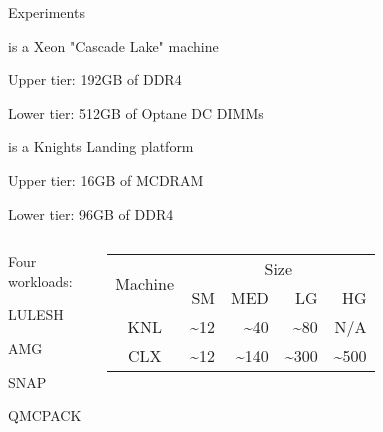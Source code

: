 \documentclass[final,hyperref={pdfpagelabels=false}]{beamer}
\begin{document}
\begin{frame}{Experiments}
  \begin{customlist}{0em}{0em}
    \item {} is a Xeon "Cascade Lake" machine
    \begin{customlist}{1em}{0em}
      \item Upper tier: 192GB of DDR4
      \item Lower tier: 512GB of Optane DC DIMMs
    \end{customlist}
    \item {} is a Knights Landing platform
    \begin{customlist}{1em}{0em}
      \item Upper tier: 16GB of MCDRAM
      \item Lower tier: 96GB of DDR4
    \end{customlist}
  \end{customlist}

  \vspace{1em}

  \begin{minipage}{\paperwidth}
  \begin{columns}[T,onlytextwidth]%
    \begin{customlist}{0em}{0em}
      \item Four workloads:
      \begin{customlist}{1em}{0em}
        \item LULESH
        \item AMG
        \item SNAP
        \item QMCPACK
      \end{customlist}
    \end{customlist}
    \centering
    \begin{table}[t]
      \centering
      \footnotesize
      \begin{tabular}{|c|r|r|r|r|}
        \hline
        \multirow{2}{*}{Machine} &
        \multicolumn{4}{c|}{Size} \\
        \cline{2-5}
        & SM & MED & LG & HG \\
        \hline

        KNL & \textasciitilde12 & \textasciitilde40 & \textasciitilde80 & N/A \\
        \hline
        CLX & \textasciitilde12 & \textasciitilde140 & \textasciitilde300 & \textasciitilde500 \\
        \hline
      \end{tabular}
    \end{table}
  \end{columns}
  \end{minipage}
\end{frame}
\end{document}
